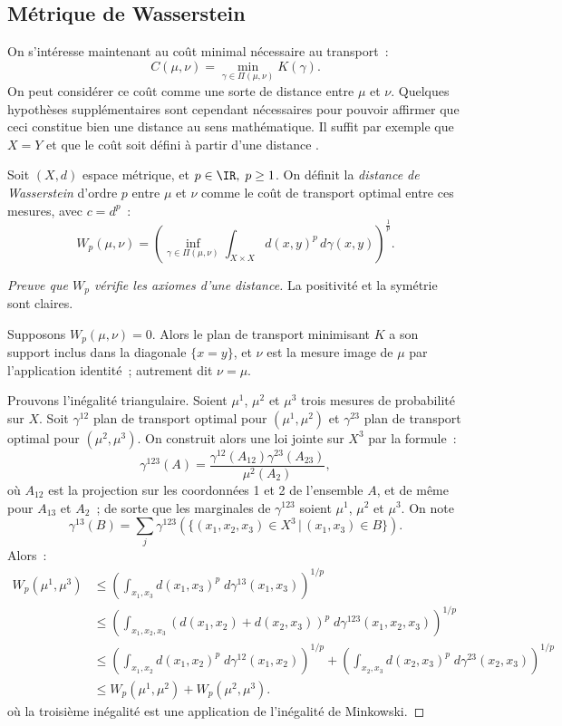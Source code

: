 \subsection{Métrique de Wasserstein}
On s'intéresse maintenant au coût minimal nécessaire au transport~:
\[C(\mu,\nu) = \min_{\gamma \in \Pi(\mu,\nu)} K(\gamma). \]
On peut considérer ce coût comme une sorte de distance entre $\mu$ et $\nu$. Quelques hypothèses supplémentaires sont cependant nécessaires pour pouvoir affirmer que ceci constitue bien une distance au sens mathématique. Il suffit par exemple que $X=Y$ et que le coût soit défini à partir d'une distance \cite{villani08}.

\begin{definition}
Soit $(X,d)$ espace métrique, et $p \in \IR,\;p \ge 1$. On définit la \emph{distance de Wasserstein} d'ordre $p$ entre $\mu$ et $\nu$ comme le coût de transport optimal entre ces mesures, avec $c = d^p$~:
\begin{equation}
\label{eq:wasserstein}
W_p(\mu,\nu) = \left(\inf_{\gamma \in \Pi(\mu,\nu)} \int_{X\times X} d(x,y)^p\,d\gamma(x,y) \right)^{\frac{1}{p}}.\end{equation}
\end{definition}

\begin{proof}[Preuve que $W_p$ vérifie les axiomes d'une distance]
La positivité et la symétrie sont claires.

Supposons $W_p(\mu,\nu) = 0$. Alors le plan de transport minimisant $K$ a son support inclus dans la diagonale $\{x=y\}$, et $\nu$ est la mesure image de $\mu$ par l'application identité~; autrement dit $\nu = \mu$.

Prouvons l'inégalité triangulaire. Soient $\mu^1$, $\mu^2$ et $\mu^3$ trois mesures de probabilité sur $X$. Soit $\gamma^{12}$ plan de transport optimal pour $(\mu^1,\mu^2)$ et $\gamma^{23}$ plan de transport optimal pour $(\mu^2,\mu^3)$. On construit alors une loi jointe sur $X^3$ par la formule~:
\[\gamma^{123}(A) = \frac{\gamma^{12}(A_{12}) \gamma^{23}(A_{23})}{\mu^2(A_2)} , \]
où $A_{12}$ est la projection sur les coordonnées 1 et 2 de l'ensemble $A$, et de même pour $A_{13}$ et $A_{2}$~;
de sorte que les marginales de $\gamma^{123}$ soient $\mu^1$, $\mu^2$ et $\mu^3$. On note \[\gamma^{13}(B) = \sum_{j} \gamma^{123}(\{(x_1,x_2,x_3) \in X^3 \,|\, (x_1,x_3) \in B\}).\] Alors~:
\[\begin{split}
W_p(\mu^1,\mu^3) & \le \left( \int_{x_1,x_3} d(x_1,x_3)^p \;d\gamma^{13}(x_1,x_3) \right)^{1/p} \\
&\le \left( \int_{x_1,x_2,x_3} (d(x_1,x_2) + d(x_2,x_3))^p \;d\gamma^{123}(x_1,x_2,x_3) \right)^{1/p} \\
& \le \left( \int_{x_1,x_2} d(x_1,x_2)^p \;d\gamma^{12}(x_1,x_2) \right)^{1/p} + \left( \int_{x_2,x_3} d(x_2,x_3)^p \;d\gamma^{23}(x_2,x_3) \right)^{1/p} \\
& \le W_p(\mu^1,\mu^2) + W_p(\mu^2,\mu^3).
\end{split}\]
où la troisième inégalité est une application de l'inégalité de Minkowski.
\end{proof}

